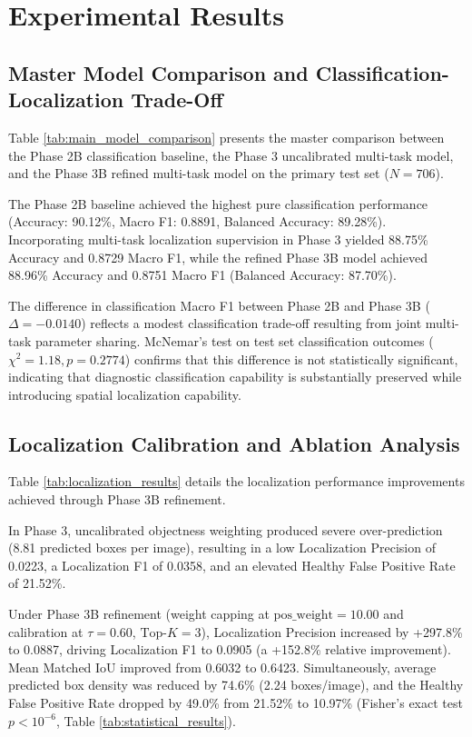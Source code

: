 \section{Experimental Results}
\label{sec:results}

\subsection{Master Model Comparison and Classification-Localization Trade-Off}
Table \ref{tab:main_model_comparison} presents the master comparison between the Phase 2B classification baseline, the Phase 3 uncalibrated multi-task model, and the Phase 3B refined multi-task model on the primary test set ($N=706$).

The Phase 2B baseline achieved the highest pure classification performance (Accuracy: 90.12\%, Macro F1: 0.8891, Balanced Accuracy: 89.28\%). Incorporating multi-task localization supervision in Phase 3 yielded 88.75\% Accuracy and 0.8729 Macro F1, while the refined Phase 3B model achieved 88.96\% Accuracy and 0.8751 Macro F1 (Balanced Accuracy: 87.70\%). 

The difference in classification Macro F1 between Phase 2B and Phase 3B ($\Delta = -0.0140$) reflects a modest classification trade-off resulting from joint multi-task parameter sharing. McNemar's test on test set classification outcomes ($\chi^2 = 1.18, p = 0.2774$) confirms that this difference is not statistically significant, indicating that diagnostic classification capability is substantially preserved while introducing spatial localization capability.

\subsection{Localization Calibration and Ablation Analysis}
Table \ref{tab:localization_results} details the localization performance improvements achieved through Phase 3B refinement.

In Phase 3, uncalibrated objectness weighting produced severe over-prediction (8.81 predicted boxes per image), resulting in a low Localization Precision of 0.0223, a Localization F1 of 0.0358, and an elevated Healthy False Positive Rate of 21.52\%.

Under Phase 3B refinement (weight capping at $\text{pos\_weight}=10.00$ and calibration at $\tau = 0.60$, $\text{Top-}K=3$), Localization Precision increased by +297.8\% to 0.0887, driving Localization F1 to 0.0905 (a +152.8\% relative improvement). Mean Matched IoU improved from 0.6032 to 0.6423. Simultaneously, average predicted box density was reduced by 74.6\% (2.24 boxes/image), and the Healthy False Positive Rate dropped by 49.0\% from 21.52\% to 10.97\% (Fisher's exact test $p < 10^{-6}$, Table \ref{tab:statistical_results}).

